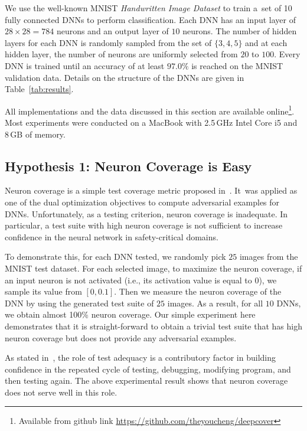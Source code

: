 \documentclass[runningheads,a4paper]{llncs}
\begin{document}
We use the well-known MNIST \emph{Handwritten Image Dataset} to train a~set
of 10 fully connected DNNs to perform classification.  Each DNN has an input
layer of $28\times 28=784$ neurons and an output layer of $10$ neurons.  The
number of hidden layers for each DNN is randomly sampled from the set of $\{3,
4, 5\}$ and at each hidden layer, the number of neurons are uniformly
selected from $20$ to $100$.  Every DNN is trained until an accuracy of at
least $97.0\%$ is reached on the MNIST validation data.  Details on the
structure of the DNNs are given in Table~\ref{tab:results}.

All implementations and the data discussed in this section are available
online\footnote{Available from github link \url{https://github.com/theyoucheng/deepcover}}.
Most experiments were conducted on a MacBook 
with 2.5\,GHz Intel Core i5 and 8\,GB of memory.

\subsection{Hypothesis 1: Neuron Coverage is Easy}

Neuron coverage is a simple test coverage metric proposed
in~\cite{PCYJ2017}.  It~was applied as one of the dual optimization
objectives to compute adversarial examples for DNNs.  Unfortunately, as a
testing criterion, neuron coverage is inadequate.  In particular, a test
suite with high neuron coverage is not sufficient to increase confidence in
the neural network in safety-critical domains.

To demonstrate this, for each DNN tested, we randomly pick $25$ images from
the MNIST test dataset.  For each selected image, to maximize the neuron
coverage, if an input neuron is not activated (i.e., its activation value
is equal to 0), we sample its value from $[0, 0.1]$.  Then we measure
the neuron coverage of the DNN by using the generated test suite of $25$
images.  As a result, for all $10$ DNNs, we obtain almost 100\% neuron
coverage.  Our simple experiment here demonstrates that it is
straight-forward to obtain a trivial test suite that has high neuron
coverage but does not provide any adversarial examples.

As stated in~\cite{ZHM1997}, the role of test adequacy is a contributory
factor in building confidence in the repeated cycle of testing, debugging,
modifying program, and then testing again.  The above experimental result
shows that neuron coverage does not serve well in this role.
\end{document}
